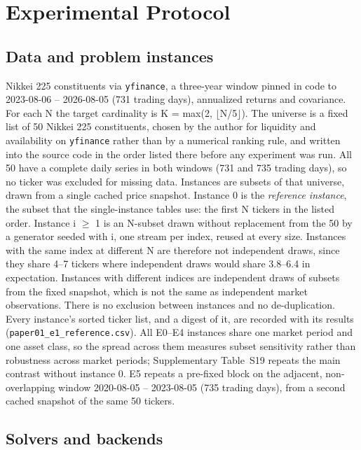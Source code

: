 \documentclass[journal]{IEEEtran}
\begin{document}
\section{Experimental Protocol}


\subsection{Data and problem instances}


Nikkei 225 constituents via \texttt{yfinance}, a three-year window pinned in code to 2023-08-06 -- 2026-08-05 (731 trading days), annualized returns and covariance. For each N the target cardinality is K = max(2, $\lfloor$N/5$\rfloor$). The universe is a fixed list of 50 Nikkei 225 constituents, chosen by the author for liquidity and availability on \texttt{yfinance} rather than by a numerical ranking rule, and written into the source code in the order listed there before any experiment was run. All 50 have a complete daily series in both windows (731 and 735 trading days), so no ticker was excluded for missing data. Instances are subsets of that universe, drawn from a single cached price snapshot. Instance 0 is the \textit{reference instance}, the subset that the single-instance tables use: the first N tickers in the listed order. Instance i $\geq$ 1 is an N-subset drawn without replacement from the 50 by a generator seeded with i, one stream per index, reused at every size. Instances with the same index at different N are therefore not independent draws, since they share 4--7 tickers where independent draws would share 3.8--6.4 in expectation. Instances with different indices are independent draws of subsets from the fixed snapshot, which is not the same as independent market observations. There is no exclusion between instances and no de-duplication. Every instance's sorted ticker list, and a digest of it, are recorded with its results (\texttt{paper01\_e1\_reference.csv}). All E0--E4 instances share one market period and one asset class, so the spread across them measures subset sensitivity rather than robustness across market periods; Supplementary Table~S19 repeats the main contrast without instance 0. E5 repeats a pre-fixed block on the adjacent, non-overlapping window 2020-08-05 -- 2023-08-05 (735 trading days), from a second cached snapshot of the same 50 tickers.


\subsection{Solvers and backends}
\end{document}
